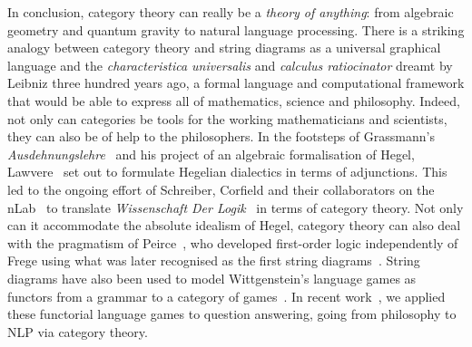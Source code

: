 In conclusion, category theory can really be a \emph{theory of anything}: from algebraic geometry and quantum gravity to natural language processing.
There is a striking analogy between category theory and string diagrams as a universal graphical language and the \emph{characteristica universalis} and \emph{calculus ratiocinator} dreamt by Leibniz three hundred years ago, a formal language and computational framework that would be able to express all of mathematics, science and philosophy.
Indeed, not only can categories be tools for the working mathematicians and scientists, they can also be of help to the philosophers.
In the footsteps of Grassmann's \emph{Ausdehnungslehre}~\cite{Grassmann44} and his project of an algebraic formalisation of Hegel, Lawvere~\cite{Lawvere89,Lawvere91,Lawvere92,Lawvere96} set out to formulate Hegelian dialectics in terms of adjunctions.
This led to the ongoing effort of Schreiber, Corfield and their collaborators on the nLab~\cite{SchreiberEtAl21} to translate \emph{Wissenschaft Der Logik}~\cite{Hegel12} in terms of category theory.
Not only can it accommodate the absolute idealism of Hegel, category theory can also deal with the pragmatism of Peirce~\cite{Peirce06},
who developed first-order logic independently of Frege using what was later recognised as the first string diagrams~\cite{BradyTrimble98,BradyTrimble00,MelliesZeilberger16,HaydonSobocinski20}.
String diagrams have also been used to model Wittgenstein's language games as functors from a grammar to a category of games~\cite{HedgesLewis18}.
In recent work~\cite{FeliceEtAl20a}, we applied these functorial language games to question answering, going from philosophy to NLP via category theory.
